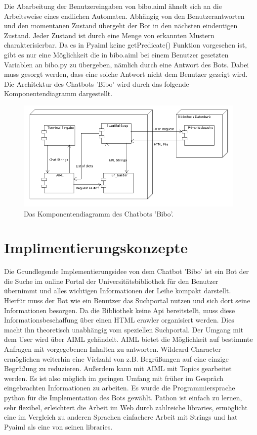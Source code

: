 \documentclass[12pt,a4paper]{scrartcl}
\begin{document}
Die Abarbeitung der Benutzereingaben von bibo.aiml ähnelt sich an die Arbeitsweise eines endlichen Automaten. Abhängig von den Benutzerantworten und den momentanen Zustand übergeht der Bot in den nächsten eindeutigen Zustand. Jeder Zustand ist durch eine Menge von erkannten Mustern charakterisierbar. Da es in Pyaiml keine getPredicate() Funktion vorgesehen ist, gibt es nur eine Möglichkeit die in bibo.aiml bei einem Benutzer gesetzten Variablen an bibo.py zu übergeben, nämlich durch eine Antwort des Bots. Dabei muss gesorgt werden, dass eine solche Antwort nicht dem Benutzer gezeigt wird.\newline
\newpage
Die Architektur des Chatbots 'Bibo' wird durch das folgende Komponentendiagramm dargestellt.                                                                                \begin{figure}[h!]
 \centering
  \includegraphics[width=\linewidth]{components.png}
  \caption{Das Komponentendiagramm des Chatbots 'Bibo'.}
\end{figure}
\section{Implimentierungskonzepte}
Die Grundlegende Implementierungsidee von dem Chatbot 'Bibo' ist ein Bot der die Suche im online Portal der Universitätsbibliothek für den Benutzer übernimmt und alles wichtigen Informationen der        
Leihe kompakt darstellt. Hierfür muss der Bot wie ein Benutzer das Suchportal nutzen und sich dort seine Informationen besorgen. Da die Bibliothek keine Api bereitstellt, muss diese         
Informationsbeschaffung über einen HTML crawler organisiert werden. Dies macht ihn theoretisch unabhängig vom speziellen Suchportal.\newline
Der Umgang mit dem User wird über AIML gehändelt. AIML bietet die Möglichkeit auf bestimmte Anfragen mit vorgegebenen Inhalten zu antworten. Wildcard Character ermöglichen weiterhin eine Vielzahl von z.B. Begrüßungen auf eine einzige Begrüßung zu reduzieren. Außerdem kann mit AIML mit Topics gearbeitet werden. Es ist also möglich im geringen Umfang mit früher im Gespräch eingebrachten Informationen zu arbeiten.\newline
Es wurde die Programmiersprache python für die Implementation des Bots gewählt. Pathon ist einfach zu lernen, sehr flexibel, erleichtert die Arbeit im Web durch zahlreiche libraries, ermöglicht eine im Vergleich zu anderen Sprachen einfachere Arbeit mit Strings und hat Pyaiml als eine von seinen libraries.
\newline
\end{document}
